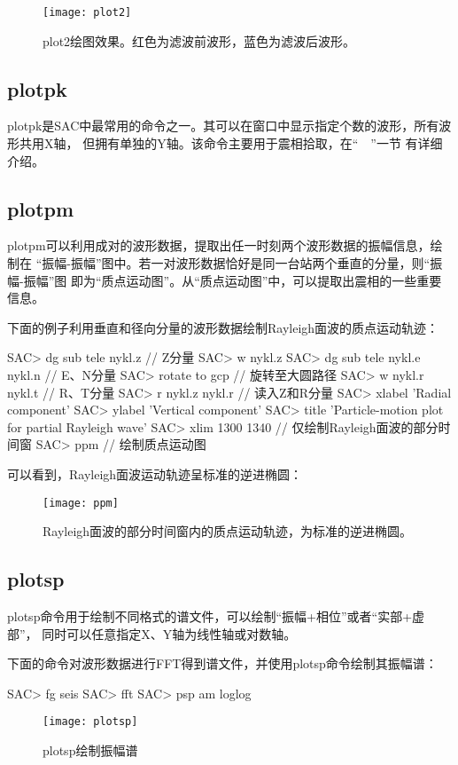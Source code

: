 \begin{figure}[H]
\centering
\texttt{[image: plot2]}
\caption[plot2绘图效果]{plot2绘图效果。红色为滤波前波形，蓝色为滤波后波形。}
\label{fig:plot2}
\end{figure}

\subsection{plotpk}
plotpk是SAC中最常用的命令之一。其可以在窗口中显示指定个数的波形，所有波形共用X轴，
但拥有单独的Y轴。该命令主要用于震相拾取，在``~~''一节
有详细介绍。

\subsection{plotpm}
plotpm可以利用成对的波形数据，提取出任一时刻两个波形数据的振幅信息，绘制在
``振幅-振幅''图中。若一对波形数据恰好是同一台站两个垂直的分量，则``振幅-振幅''图
即为``质点运动图''。从``质点运动图''中，可以提取出震相的一些重要信息。

下面的例子利用垂直和径向分量的波形数据绘制Rayleigh面波的质点运动轨迹：
\begin{SACCode}
SAC> dg sub tele nykl.z             // Z分量        
SAC> w nykl.z           
SAC> dg sub tele nykl.e nykl.n      // E、N分量
SAC> rotate to gcp                  // 旋转至大圆路径
SAC> w nykl.r nykl.t                // R、T分量
SAC> r nykl.z nykl.r                // 读入Z和R分量
SAC> xlabel 'Radial component'
SAC> ylabel 'Vertical component'
SAC> title 'Particle-motion plot for partial Rayleigh wave'
SAC> xlim 1300 1340                 // 仅绘制Rayleigh面波的部分时间窗
SAC> ppm                            // 绘制质点运动图
\end{SACCode}

可以看到，Rayleigh面波运动轨迹呈标准的逆进椭圆：
\begin{figure}[H]
\centering
\texttt{[image: ppm]}
\caption[质点运动图。]{Rayleigh面波的部分时间窗内的质点运动轨迹，为标准的逆进椭圆。}
\label{fig:ppm}
\end{figure}

\subsection{plotsp}
plotsp命令用于绘制不同格式的谱文件，可以绘制``振幅+相位''或者``实部+虚部''，
同时可以任意指定X、Y轴为线性轴或对数轴。

下面的命令对波形数据进行FFT得到谱文件，并使用plotsp命令绘制其振幅谱：
\begin{SACCode}
SAC> fg seis
SAC> fft
SAC> psp am loglog
\end{SACCode}

\begin{figure}[H]
\centering
\texttt{[image: plotsp]}
\caption{plotsp绘制振幅谱}
\label{fig:plotsp}
\end{figure}
